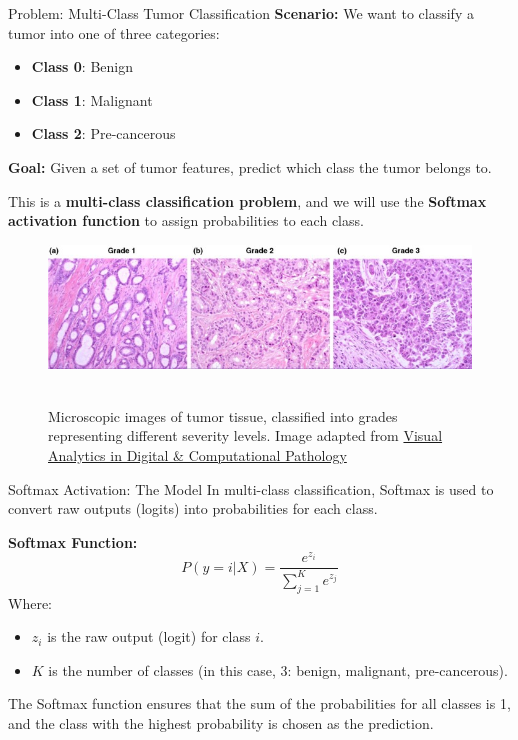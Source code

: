 \documentclass[serif, aspectratio=169]{beamer}
\begin{document}
\begin{frame}{Problem: Multi-Class Tumor Classification}
    \textbf{Scenario:} We want to classify a tumor into one of three categories:
    \begin{itemize}
        \item \textbf{Class 0}: Benign
        \item \textbf{Class 1}: Malignant
        \item \textbf{Class 2}: Pre-cancerous
    \end{itemize}
    
    \textbf{Goal:} Given a set of tumor features, predict which class the tumor belongs to.
    
    This is a \textbf{multi-class classification problem}, and we will use the \textbf{Softmax activation function} to assign probabilities to each class.
    
            \begin{figure}
\centerline{\includegraphics[scale=.3]{pic/cancer.jpg}}
\\
{Microscopic images of tumor tissue, classified into grades representing different severity levels. Image adapted from \href{https://www.researchgate.net/publication/342658460_Visual_Analytics_in_Digital_Computational_Pathology?_tp=eyJjb250ZXh0Ijp7ImZpcnN0UGFnZSI6Il9kaXJlY3QiLCJwYWdlIjoiX2RpcmVjdCJ9fQ}{Visual Analytics in Digital & Computational Pathology}}

\label{fig}
\end{figure}
\end{frame}
\begin{frame}{Softmax Activation: The Model}
    In multi-class classification, Softmax is used to convert raw outputs (logits) into probabilities for each class.
    
    \textbf{Softmax Function:}
    \[
    P(y = i | X) = \frac{e^{z_i}}{\sum_{j=1}^{K} e^{z_j}}
    \]
    Where:
    \begin{itemize}
        \item \( z_i \) is the raw output (logit) for class \( i \).
        \item \( K \) is the number of classes (in this case, 3: benign, malignant, pre-cancerous).
    \end{itemize}
    
    The Softmax function ensures that the sum of the probabilities for all classes is 1, and the class with the highest probability is chosen as the prediction.
\end{frame}
\end{document}
